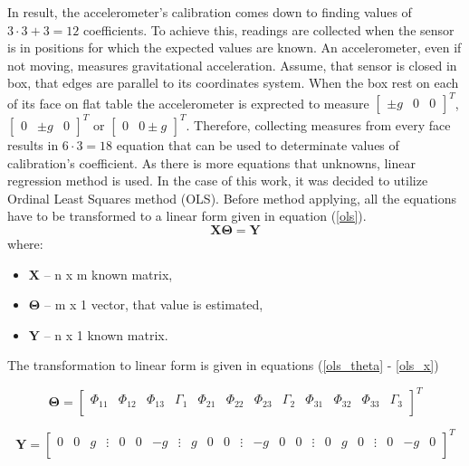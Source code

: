 In result, the accelerometer's calibration comes down to finding values of $3 \cdot 3 + 3 = 12$ coefficients. To achieve this, readings are collected when the sensor is in positions for which the expected values are known. An accelerometer, even if not moving, measures gravitational acceleration. Assume, that sensor is closed in box, that edges are parallel to its coordinates system. When the box rest on each of its face on flat table the accelerometer is exprected to measure $\begin{bmatrix}\pm g & 0 & 0\end{bmatrix}^T$, $\begin{bmatrix}0 & \pm g & 0\end{bmatrix}^T$ or $\begin{bmatrix} 0 & 0 \pm g\end{bmatrix}^T$. Therefore, collecting measures from every face results in $6 \cdot 3 = 18$ equation that can be used to determinate values of calibration's coefficient. As there is more equations that unknowns, linear regression method is used. In the case of this work, it was decided to utilize Ordinal Least Squares method (OLS). Before method applying, all the equations have to be transformed to a linear form given in equation (\ref{ols}).
\begin{equation}
	\bm{X} \bm{\Theta} = \bm{Y}
	\label{ols}
\end{equation}
where:
\begin{itemize}
	\item $\bm{X}$ -- n x m known matrix,
	\item $\bm{\Theta}$ -- m x 1 vector, that value is estimated,
	\item $\bm{Y}$ -- n x 1 known matrix.
\end{itemize}
 
The transformation to linear form is given in equations (\ref{ols_theta} - \ref{ols_x})
\setcounter{MaxMatrixCols}{25}

\begin{equation}
	\bm{\Theta} = \begin{bmatrix} \Phi_{11} & \Phi_{12} & \Phi_{13} & \Gamma_1 & \Phi_{21} & \Phi_{22} & \Phi_{23} & \Gamma_2 & \Phi_{31} & \Phi_{32} & \Phi_{33} & \Gamma_3 \\
	\end{bmatrix}^T
	\label{ols_theta}
\end{equation}


\begin{equation}
	\bm{Y} = \begin{bmatrix} 0 & 0 & g & \vdots & 0 & 0 & -g & \vdots & g & 0 & 0 & \vdots & -g & 0 & 0  & \vdots& 0 & g & 0 & \vdots & 0 & -g & 0 \\
	\end{bmatrix}^T
	\label{ols_y}
\end{equation}

